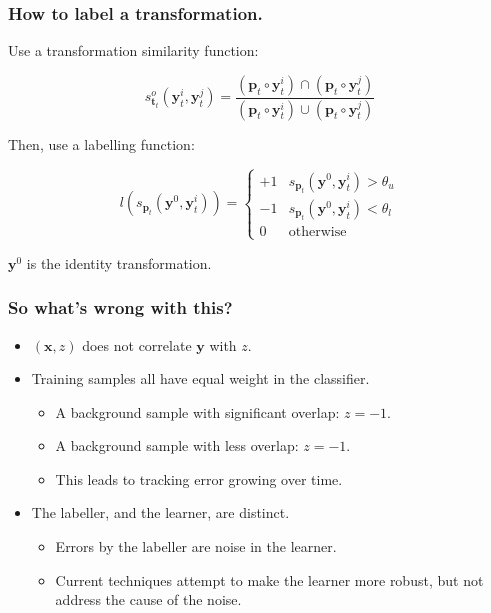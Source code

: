 \documentclass[mathserif,handout]{beamer}
\begin{document}
\begin{frame}
    \frametitle{How to label a transformation.}
    Use a transformation similarity function:

    \begin{equation}
        s_{\mathbf{t}_t}^o \left( \mathbf{y}_t^i, \mathbf{y}_t^j \right) =
            \frac{\left( \mathbf{p}_t \circ \mathbf{y}_t^i \right) \cap \left( \mathbf{p}_t \circ \mathbf{y}_t^j \right)}
                 {\left( \mathbf{p}_t \circ \mathbf{y}_t^i \right) \cup \left( \mathbf{p}_t \circ \mathbf{y}_t^j \right)}
    \end{equation}

    Then, use a labelling function:

    \begin{equation}
        l\left( s_{\mathbf{p}_t}\left(\mathbf{y}^0, \mathbf{y}_t^i \right) \right) =
            \begin{cases}
                +1 & s_{\mathbf{p}_t}\left(\mathbf{y}^0, \mathbf{y}_t^i \right) > \theta_u \\
                -1 & s_{\mathbf{p}_t}\left(\mathbf{y}^0, \mathbf{y}_t^i \right) < \theta_l \\
                 0 & \text{otherwise}
            \end{cases}
    \end{equation}

    $\mathbf{y}^0$ is the identity transformation.
\end{frame}

\begin{frame}
    \frametitle{So what's wrong with this?}

    \begin{itemize}
        \item $(\mathbf{x}, z)$ does not correlate $\mathbf{y}$ with $z$.
        \item Training samples all have equal weight in the classifier.
            \begin{itemize}
                \item A background sample with significant overlap: $z = -1$.
                \item A background sample with less overlap: $z = -1$.
                \item This leads to tracking error growing over time.
            \end{itemize}
        \item The labeller, and the learner, are distinct.
            \begin{itemize}
                \item Errors by the labeller are noise in the learner.
                \item Current techniques attempt to make the learner more
                    robust, but not address the cause of the noise.
            \end{itemize}
    \end{itemize}
\end{frame}
\end{document}
